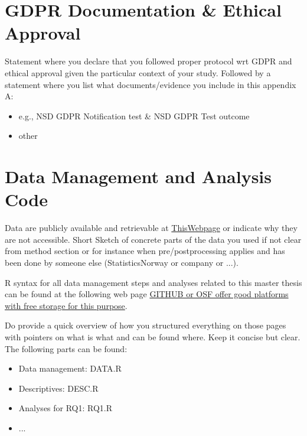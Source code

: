 \documentclass[a4paper,12pt,stu,donotrepeattitle,floatsintext,twoside]{apa7}
\begin{document}
\printbibliography


\appendix

\section{GDPR Documentation \& Ethical Approval}\label{app:A}

\appindent Statement where you declare that you followed proper protocol wrt GDPR and ethical approval given the particular context of your study. Followed by a statement where you list what documents/evidence you include in this appendix A:
\begin{itemize}
    \item e.g., NSD GDPR Notification test \& NSD GDPR Test outcome
    \item other
\end{itemize}




\section{Data Management and Analysis Code}\label{app:B}

\appindent Data are publicly available and retrievable at \url{ThisWebpage} or indicate why they are not accessible. Short Sketch of concrete parts of the data you used if not clear from method section or for instance when pre/postprocessing applies and has been done by someone else (StatisticsNorway or company or ...).


R syntax for all data management steps and analyses related to this master thesis can be found at the following web page \url{GITHUB or OSF offer good platforms with free storage for this purpose}.

Do provide a quick overview of how you structured everything on those pages with pointers on what is what and can be found where. Keep it concise but  clear. The following parts can be found:
\begin{itemize}
    \item Data management: DATA.R
    \item Descriptives: DESC.R
    \item Analyses for RQ1: RQ1.R
    \item ...
\end{itemize}
\end{document}
